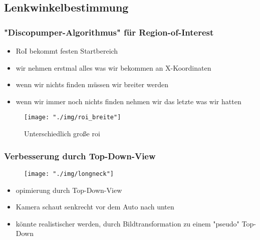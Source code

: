 \documentclass{beamer}
\begin{document}
	\subsection{Lenkwinkelbestimmung}
	
	\begin{frame}
		\frametitle{"Discopumper-Algorithmus" für Region-of-Interest}
		\begin{itemize}
			\item RoI bekommt festen Startbereich
			\item wir nehmen erstmal alles was wir bekommen an X-Koordinaten
			\item wenn wir nichts finden müssen wir breiter werden
			\item wenn wir immer noch nichts finden nehmen wir das letzte was wir hatten
		\end{itemize}

		\begin{center}
			\begin{figure}[h]
				\texttt{[image: "./img/roi\_breite"]}
				\label{fig:roi}
				\caption{Unterschiedlich große roi}
			\end{figure}
		\end{center}
 	\end{frame}

	\begin{frame}
		\frametitle{Verbesserung durch Top-Down-View}
		\begin{center}
			\begin{figure}[h]
				\texttt{[image: "./img/longneck"]}
				\label{fig:longneck}
			\end{figure}
		\end{center}

	\begin{itemize}
		\item opimierung durch Top-Down-View
		\item Kamera schaut senkrecht vor dem Auto nach unten
		\item könnte realistischer werden, durch Bildtransformation zu einem "pseudo" Top-Down 
	\end{itemize}
	\end{frame}
\end{document}
